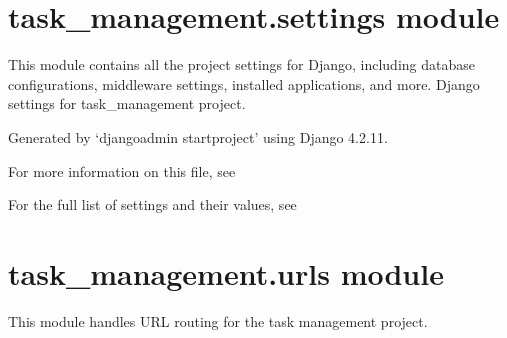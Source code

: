 \documentclass[letterpaper,10pt,english]{sphinxmanual}
\begin{document}
\section{task\_management.settings module}
\label{\detokenize{task_management:task-management-settings-module}}\label{\detokenize{task_management:module-task_management.routing}}
\sphinxAtStartPar
This module contains all the project settings for Django, including database configurations, middleware settings, installed applications, and more.
\label{\detokenize{task_management:module-task_management.settings}}
\sphinxAtStartPar
Django settings for task\_management project.

\sphinxAtStartPar
Generated by ‘django\sphinxhyphen{}admin startproject’ using Django 4.2.11.

\sphinxAtStartPar
For more information on this file, see

\sphinxAtStartPar
For the full list of settings and their values, see


\section{task\_management.urls module}
\label{\detokenize{task_management:task-management-urls-module}}
\sphinxAtStartPar
This module handles URL routing for the task management project.
\end{document}
